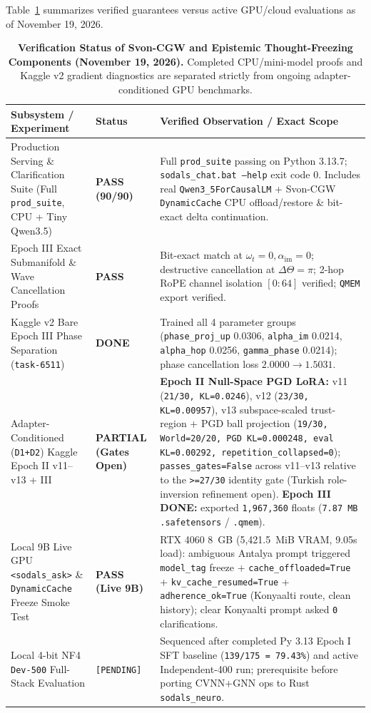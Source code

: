\documentclass[11pt,a4paper]{article}
\begin{document}
Table~\ref{tab:paper4_status} summarizes verified guarantees versus active GPU/cloud evaluations as of November 19, 2026.

\begin{table}[t]
\centering
\caption{\textbf{Verification Status of Svon-CGW and Epistemic Thought-Freezing Components (November 19, 2026).} Completed CPU/mini-model proofs and Kaggle v2 gradient diagnostics are separated strictly from ongoing adapter-conditioned GPU benchmarks.}
\label{tab:paper4_status}
\small
\begin{tabular}{@{}p{4.8cm}p{2.2cm}p{7.4cm}@{}}
\toprule
\textbf{Subsystem / Experiment} & \textbf{Status} & \textbf{Verified Observation / Exact Scope} \\
\midrule
Production Serving \& Clarification Suite (Full \texttt{prod\_suite}, CPU + Tiny Qwen3.5) & \textbf{PASS (90/90)} & Full \texttt{prod\_suite} passing on Python 3.13.7; \texttt{sodals\_chat.bat --help} exit code 0. Includes real \texttt{Qwen3\_5ForCausalLM} + Svon-CGW \texttt{DynamicCache} CPU offload/restore \& bit-exact delta continuation. \\
Epoch III Exact Submanifold \& Wave Cancellation Proofs & \textbf{PASS} & Bit-exact match at $\omega_t=0, \alpha_{\text{im}}=0$; destructive cancellation at $\Delta\Theta=\pi$; 2-hop RoPE channel isolation $[0:64]$ verified; \texttt{QMEM} export verified. \\
Kaggle v2 Bare Epoch III Phase Separation (\texttt{task-6511}) & \textbf{DONE} & Trained all 4 parameter groups (\texttt{phase\_proj\_up} 0.0306, \texttt{alpha\_im} 0.0214, \texttt{alpha\_hop} 0.0256, \texttt{gamma\_phase} 0.0214); phase cancellation loss $2.0000 \to 1.5031$. \\
\midrule
Adapter-Conditioned (\texttt{D1+D2}) Kaggle Epoch II v11--v13 + III & \textbf{PARTIAL (Gates Open)} & \textbf{Epoch II Null-Space PGD LoRA:} v11 (\texttt{21/30, KL=0.0246}), v12 (\texttt{23/30, KL=0.00957}), v13 subspace-scaled trust-region + PGD ball projection (\texttt{19/30, World=20/20, PGD KL=0.000248, eval KL=0.00292, repetition\_collapsed=0}); \texttt{passes\_gates=False} across v11--v13 relative to the \texttt{>=27/30} identity gate (Turkish role-inversion refinement open). \textbf{Epoch III DONE:} exported \texttt{1,967,360} floats (\texttt{7.87 MB} \texttt{.safetensors} / \texttt{.qmem}). \\
Local 9B Live GPU \texttt{<sodals\_ask>} \& \texttt{DynamicCache} Freeze Smoke Test & \textbf{PASS (Live 9B)} & RTX 4060 8~GB (5,421.5~MiB VRAM, 9.05s load): ambiguous Antalya prompt triggered \texttt{model\_tag} freeze + \texttt{cache\_offloaded=True} + \texttt{kv\_cache\_resumed=True} + \texttt{adherence\_ok=True} (Konyaalti route, clean history); clear Konyaalti prompt asked \texttt{0} clarifications. \\
Local 4-bit NF4 \texttt{Dev-500} Full-Stack Evaluation & \texttt{[PENDING]} & Sequenced after completed Py 3.13 Epoch I SFT baseline (\texttt{139/175 = 79.43\%}) and active Independent-400 run; prerequisite before porting CVNN+GNN ops to Rust \texttt{sodals\_neuro}. \\
\bottomrule
\end{tabular}
\end{table}
\end{document}
